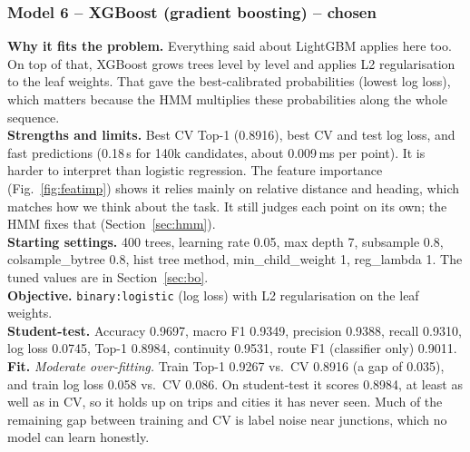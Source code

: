 \documentclass[11pt,a4paper]{article}
\newcommand{\code}[1]{\texttt{\small #1}}
\begin{document}
\subsubsection*{Model 6 -- XGBoost (gradient boosting) -- chosen}
\textbf{Why it fits the problem.} Everything said about LightGBM applies here too. On top of that, XGBoost
grows trees level by level and applies L2 regularisation to the leaf weights. That gave the best-calibrated
probabilities (lowest log loss), which matters because the HMM multiplies these probabilities along the
whole sequence.\\
\textbf{Strengths and limits.} Best CV Top-1 (0.8916), best CV and test log loss, and fast predictions
(0.18\,s for 140k candidates, about 0.009\,ms per point). It is harder to interpret than logistic regression.
The feature importance (Fig.~\ref{fig:featimp}) shows it relies mainly on relative distance and heading,
which matches how we think about the task. It still judges each point on its own; the HMM fixes that
(Section~\ref{sec:hmm}).\\
\textbf{Starting settings.} 400 trees, learning rate 0.05, max depth 7, subsample 0.8, colsample\_bytree 0.8,
hist tree method, min\_child\_weight 1, reg\_lambda 1. The tuned values are in Section~\ref{sec:bo}.\\
\textbf{Objective.} \code{binary:logistic} (log loss) with L2 regularisation on the leaf weights.\\
\textbf{Student-test.} Accuracy 0.9697, macro F1 0.9349, precision 0.9388, recall 0.9310, log loss 0.0745,
Top-1 0.8984, continuity 0.9531, route F1 (classifier only) 0.9011.\\
\textbf{Fit.} \emph{Moderate over-fitting.} Train Top-1 0.9267 vs.\ CV 0.8916 (a gap of 0.035), and train
log loss 0.058 vs.\ CV 0.086. On student-test it scores 0.8984, at least as well as in CV, so it holds up on
trips and cities it has never seen. Much of the remaining gap between training and CV is label noise near
junctions, which no model can learn honestly.
\end{document}
